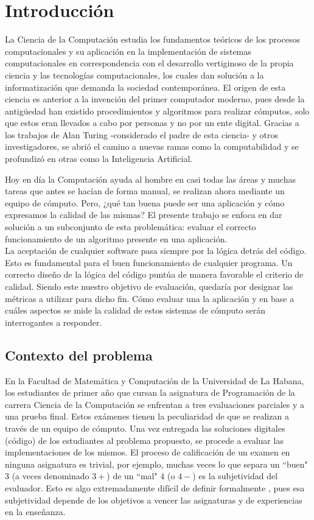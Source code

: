 \documentclass[a4paper,12pt]{book}
\begin{document}
\chapter{Introducción}

	La Ciencia de la Computación estudia los fundamentos teóricos de los procesos computacionales y su aplicación en la implementación de sistemas computacionales en correspondencia con el desarrollo vertiginoso de la propia ciencia y las tecnologías computacionales, los cuales dan solución a la informatización que demanda la sociedad contemporánea. El origen de esta ciencia es anterior a la invención del primer computador moderno, pues desde la antigüedad han existido procedimientos y algoritmos para realizar cómputos, solo que estos eran llevados a cabo por personas y no por un ente digital. Gracias a los trabajos de Alan Turing \cite{Turing} -considerado el padre de esta ciencia- y otros investigadores, se abrió el camino a nuevas ramas como la computabilidad y se profundizó en otras como la Inteligencia Artificial.
	
	Hoy en día la Computación ayuda al hombre en casi todas las áreas y muchas tareas que antes se hacían de forma manual, se realizan ahora mediante un equipo de cómputo. Pero, ¿qué tan buena puede ser una aplicación y cómo expresamos la calidad de las mismas? El presente trabajo se enfoca en dar solución a un subconjunto de esta problemática: evaluar el correcto funcionamiento de un algoritmo presente en una aplicación. \\
	
	La aceptación de cualquier software pasa siempre por la lógica detrás del código. Esto es fundamental para el buen funcionamiento de cualquier programa. Un correcto diseño de la lógica del código puntúa de manera favorable el criterio de calidad. Siendo este nuestro objetivo de evaluación, quedaría por designar las métricas a utilizar para dicho fin. Cómo evaluar una la aplicación y en base a cuáles aspectos se mide la calidad de estos sistemas de cómputo serán interrogantes a responder.
		
	\section{Contexto del problema}
		
		En la Facultad de Matemática y Computación de la Universidad de La Habana, los estudiantes de primer año que cursan la asignatura de Programación de la carrera Ciencia de la Computación se enfrentan a tres evaluaciones parciales y a una prueba final. Estos exámenes tienen la peculiaridad de que se realizan a través de un equipo de cómputo. Una vez entregada las soluciones digitales (código) de los estudiantes al problema propuesto, se procede a evaluar las implementaciones de los mismos. El proceso de calificación de un examen en ninguna asignatura es trivial, por ejemplo, muchas veces lo que separa un ``buen" $3$ (a veces denominado $3+$) de un ``mal" $4$ (o $4-$) es la subjetividad del evaluador. Esto es algo extremadamente difícil de definir formalmente , pues esa subjetividad depende de los objetivos a vencer las asignaturas y de experiencias en la enseñanza. 
		
\end{document}
